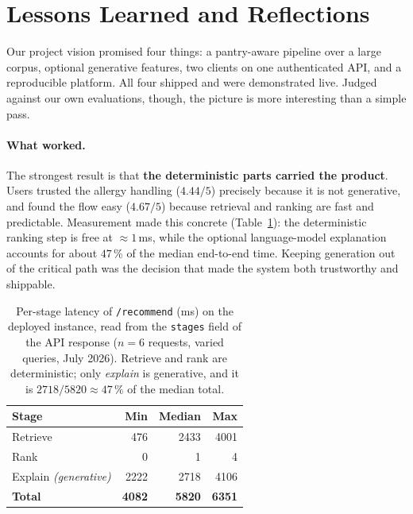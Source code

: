 \section{Lessons Learned and Reflections}
\label{sec:reflection}

Our project vision promised four things: a pantry-aware pipeline over a large
corpus, optional generative features, two clients on one authenticated API, and
a reproducible platform. All four shipped and were demonstrated live. Judged
against our own evaluations, though, the picture is more interesting than a
simple pass.

\paragraph{What worked.}
The strongest result is that \textbf{the deterministic parts carried the
product}. Users trusted the allergy handling ($4.44/5$) precisely because it is
not generative, and found the flow easy ($4.67/5$) because retrieval and
ranking are fast and predictable. Measurement made this concrete
(Table~\ref{tab:latency}): the deterministic ranking step is free at
$\approx 1$\,ms, while the optional language-model explanation accounts for
about $47\,\%$ of the median end-to-end time. Keeping generation out of the
critical path was the decision that made the system both trustworthy and
shippable.

\begin{table}[!t]
    \centering
    \footnotesize
    \caption{Per-stage latency of \texttt{/recommend} (ms) on the deployed
    instance, read from the \texttt{stages} field of the API response ($n=6$
    requests, varied queries, July 2026). Retrieve and rank are deterministic;
    only \emph{explain} is generative, and it is
    $2718/5820 \approx 47\,\%$ of the median total.}
    \label{tab:latency}
    \begin{tabular}{@{}lrrr@{}}
        \toprule
        \textbf{Stage} & \textbf{Min} & \textbf{Median} & \textbf{Max} \\
        \midrule
        Retrieve & 476 & 2433 & 4001 \\
        Rank     &   0 &    1 &    4 \\
        Explain \emph{(generative)} & 2222 & 2718 & 4106 \\
        \midrule
        \textbf{Total} & \textbf{4082} & \textbf{5820} & \textbf{6351} \\
        \bottomrule
    \end{tabular}
\end{table}

